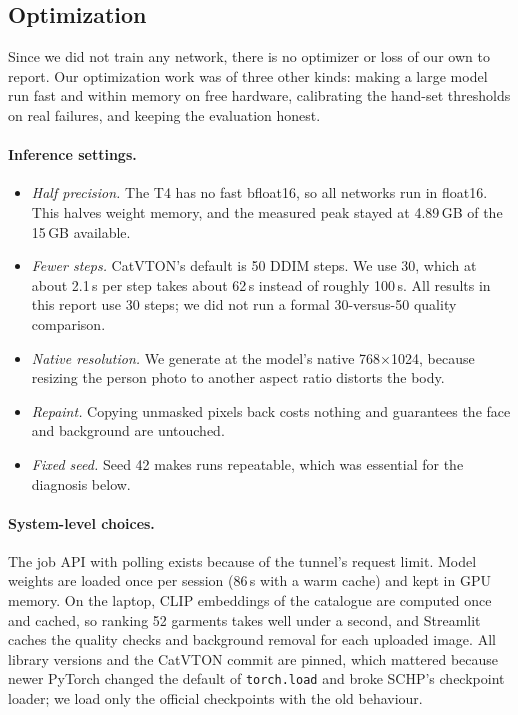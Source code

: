 \documentclass{article}
\begin{document}
\subsection{Optimization}
\label{sec:opt}

Since we did not train any network, there is no optimizer or loss of our own to report. Our
optimization work was of three other kinds: making a large model run fast and within memory on free
hardware, calibrating the hand-set thresholds on real failures, and keeping the evaluation honest.

\paragraph{Inference settings.}

\begin{itemize}
\item \emph{Half precision.} The T4 has no fast bfloat16, so all networks run in float16. This halves
weight memory, and the measured peak stayed at 4.89\,GB of the 15\,GB available.
\item \emph{Fewer steps.} CatVTON's default is 50 DDIM steps. We use 30, which at about 2.1\,s per step
takes about 62\,s instead of roughly 100\,s. All results in this report use 30 steps; we did not run a
formal 30-versus-50 quality comparison.
\item \emph{Native resolution.} We generate at the model's native 768$\times$1024, because resizing
the person photo to another aspect ratio distorts the body.
\item \emph{Repaint.} Copying unmasked pixels back costs nothing and guarantees the face and
background are untouched.
\item \emph{Fixed seed.} Seed 42 makes runs repeatable, which was essential for the diagnosis below.
\end{itemize}

\paragraph{System-level choices.}

The job API with polling exists because of the tunnel's request limit. Model weights are loaded once
per session (86\,s with a warm cache) and kept in GPU memory. On the laptop, CLIP embeddings of the
catalogue are computed once and cached, so ranking 52 garments takes well under a second, and Streamlit
caches the quality checks and background removal for each uploaded image. All library versions and the
CatVTON commit are pinned, which mattered because newer PyTorch changed the default of
\texttt{torch.load} and broke SCHP's checkpoint loader; we load only the official checkpoints with the
old behaviour.
\end{document}

